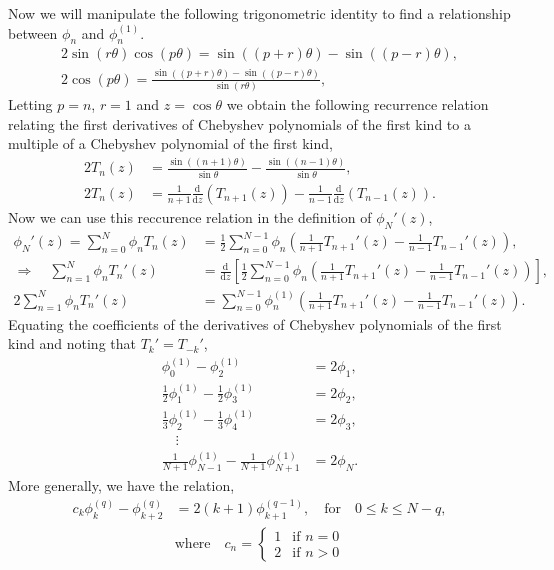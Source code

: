 \documentclass[a4paper, 12pt, twoside, openright]{article}
\numberwithin{equation}{section}
\begin{document}
Now we will manipulate the following trigonometric identity to find a relationship between $\phi_n$ and $\phi_{n}^{(1)}$.
\begin{align}
2\sin(r\theta)\cos(p\theta) = \sin((p+r)\theta) - \sin((p-r)\theta), \\
2\cos(p\theta) = \frac{\sin((p+r)\theta)-\sin((p-r)\theta)}{\sin(r\theta)},
\end{align}
Letting $p=n$, $r=1$ and $z=\cos\theta$ we obtain the following recurrence relation relating the first derivatives of Chebyshev polynomials of the first kind to a multiple of a Chebyshev polynomial of the first kind,
\begin{align}
2T_n(z) &= \frac{\sin((n+1)\theta)}{\sin\theta} - \frac{\sin((n-1)\theta)}{\sin\theta}, \\
2T_n(z) &= \frac{1}{n+1}\frac{\mathrm{d}}{\mathrm{d}z}\left(T_{n+1}(z)\right) - \frac{1}{n-1}\frac{\mathrm{d}}{\mathrm{d}z}\left(T_{n-1}(z)\right).
\end{align}
Now we can use this reccurence relation in the definition of $\phi_{N}'(z)$,
\begin{align}
\phi_{N}'(z) = \sum_{n=0}^{N} \phi_n T_n (z) &= \frac{1}{2}\sum_{n=0}^{N-1} \phi_n\left(\frac{1}{n+1}T_{n+1}'(z) - \frac{1}{n-1}T_{n-1}'(z) \right), \nonumber\\
\Rightarrow \quad \sum_{n=1}^{N} \phi_n T_n'(z) &= \frac{\mathrm{d}}{\mathrm{d}z}\left[ \frac{1}{2}\sum_{n=0}^{N-1} \phi_n\left(\frac{1}{n+1}T_{n+1}'(z) - \frac{1}{n-1}T_{n-1}'(z) \right) \right],\nonumber\\
2\sum_{n=1}^{N} \phi_n T_n'(z) &= \sum_{n=0}^{N-1} \phi_n^{(1)}\left(\frac{1}{n+1}T_{n+1}'(z) - \frac{1}{n-1}T_{n-1}'(z) \right).
\end{align}
Equating the coefficients of the derivatives of Chebyshev polynomials of the first kind and noting that $T_{k}' = T_{-k}'$,
\begin{align}
\phi_0 ^{(1)} - \phi_2^{(1)} &= 2\phi_1,\nonumber\\
\frac{1}{2}\phi_1 ^{(1)} - \frac{1}{2}\phi_3^{(1)} &= 2\phi_2,\nonumber\\
\frac{1}{3}\phi_2 ^{(1)} - \frac{1}{3}\phi_4^{(1)} &= 2\phi_3,\nonumber\\
\quad \vdots \nonumber\\
\frac{1}{N+1}\phi_{N-1} ^{(1)} - \frac{1}{N+1}\phi_{N+1}^{(1)} &= 2\phi_{N}.
\end{align}
More generally, we have the relation,
\begin{align}
c_{k}\phi_{k}^{(q)}- \phi_{k+2}^{(q)} &= 2(k+1)\phi_{k+1}^{(q-1)}, \quad \text{for} \quad 0 \leq k \leq N-q, \\
\quad &\text{where} \quad 
c_n = \begin{cases}
1 &\text{if $n=0$}\\
2 &\text{if $n>0$}
\end{cases}
\end{align}
\end{document}
